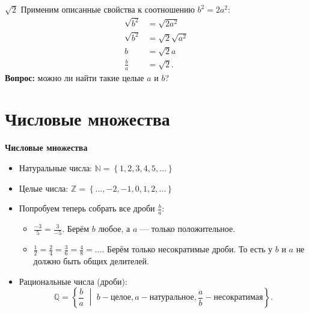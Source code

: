 \documentclass[11pt]{beamer}
\newcommand\fram[2]{\begin{frame}{\bf #1} #2 \end{frame}}
\newcommand{\set}[1]{\left\{ #1 \right\}}
\begin{document}
\fram{$\sqrt{2}$}{
Применим описанные свойства к соотношению $b^2 = 2a^2$:
\begin{align*}
    \sqrt{b^2} &= \sqrt{2a^2}\\
    \sqrt{b^2} &= \sqrt{2}\sqrt{a^2}\\
    b &= \sqrt{2}a\\
    \frac{b}{a} &= \sqrt{2}.
\end{align*}
\textbf{Вопрос:} можно ли найти такие целые $a$ и $b$?
}

\section{Числовые множества}
\fram{Числовые множества}{
\begin{itemize}
    \item Натуральные числа: $\mathbb{N} = \set{1, 2, 3, 4, 5, \ldots}$ \vspace{3mm}
    \item Целые числа: $\mathbb{Z} = \set{\ldots, -2, -1, 0, 1, 2, \ldots}$ \vspace{3mm}
    \item Попробуем теперь собрать все дроби $\frac{b}{a}$: \vspace{2mm}
    \begin{itemize}
        \item $\frac{-3}{5} = \frac{3}{-5}$. Берём $b$ любое, а $a$ --- только положительное. \vspace{2mm}
        \item $\frac{1}{2} = \frac{2}{4} = \frac{3}{6} = \frac{4}{8} = \ldots$.
        Берём только несократимые дроби. То есть у $b$ и $a$ не должно быть общих делителей. \vspace{1mm}
    \end{itemize}
    \item Рациональные числа (дроби): 
    $$\mathbb{Q} = \set{\frac{b}{a} \,\,\middle|\,\, b - \text{целое}, a - \text{натуральное}, \frac{a}{b} - \text{несократимая}}.$$
\end{itemize}
}
\end{document}
